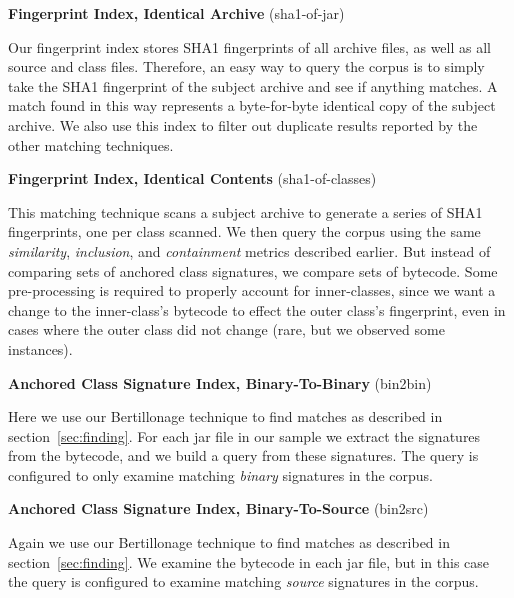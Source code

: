 \begin{description}
\item \textbf{Fingerprint Index, Identical Archive} (sha1-of-jar)

Our fingerprint index stores SHA1 fingerprints of all archive files, as
well as all source and class files.  Therefore, an easy way to query the
corpus is to simply take the SHA1 fingerprint of the subject archive and
see if anything matches.   A match found in this way represents a
byte-for-byte identical copy of the subject archive.  We also use this
index to filter out duplicate results reported by the other matching
techniques.

\vspace{0.7em}
\item \textbf{Fingerprint Index, Identical Contents} (sha1-of-classes)

This matching technique scans a subject archive to generate a series of
SHA1 fingerprints, one per class scanned.  We then query the corpus using
the same \emph{similarity}, \emph{inclusion}, and \emph{containment}
metrics described earlier.  But instead of comparing sets of anchored class
signatures, we compare sets of bytecode.  Some pre-processing is required
to properly account for inner-classes, since we want a change to the
inner-class's bytecode to effect the outer class's fingerprint, even in
cases where the outer class did not change (rare, but we observed some
instances).

\vspace{0.7em}
\item \textbf{Anchored Class Signature Index, Binary-To-Binary} (bin2bin)

Here we use our Bertillonage technique to find matches as described in
section~\ref{sec:finding}.  For each jar file in our sample we extract the
signatures from the bytecode, and we build a query from these signatures.
The query is configured to only examine matching \emph{binary} signatures in the corpus.


\vspace{0.7em}
\item \textbf{Anchored Class Signature Index, Binary-To-Source} (bin2src)

Again we use our Bertillonage technique to find matches as described in
section~\ref{sec:finding}.  We examine the bytecode in each jar file, but
in this case the query is configured to examine matching \emph{source} signatures in
the corpus.  


\end{description}

